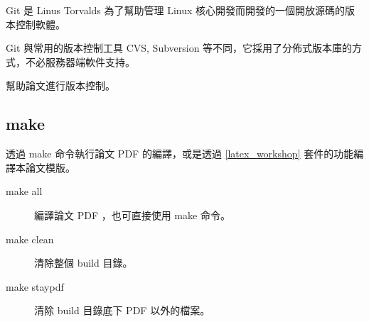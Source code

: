 Git 是 Linus Torvalds 為了幫助管理 Linux 核心開發而開發的一個開放源碼的版本控制軟體。

Git 與常用的版本控制工具 CVS, Subversion 等不同，它採用了分佈式版本庫的方式，不必服務器端軟件支持。

幫助論文進行版本控制。

\subsection{make}

透過 make 命令執行論文 PDF 的編譯，或是透過 \ref*{latex_workshop} 套件的功能編譯本論文模版。

\begin{description}
    \item[make all] 編譯論文 PDF ，也可直接使用 make 命令。
    \item[make clean] 清除整個 build 目錄。
    \item[make staypdf] 清除 build 目錄底下 PDF 以外的檔案。
\end{description}

